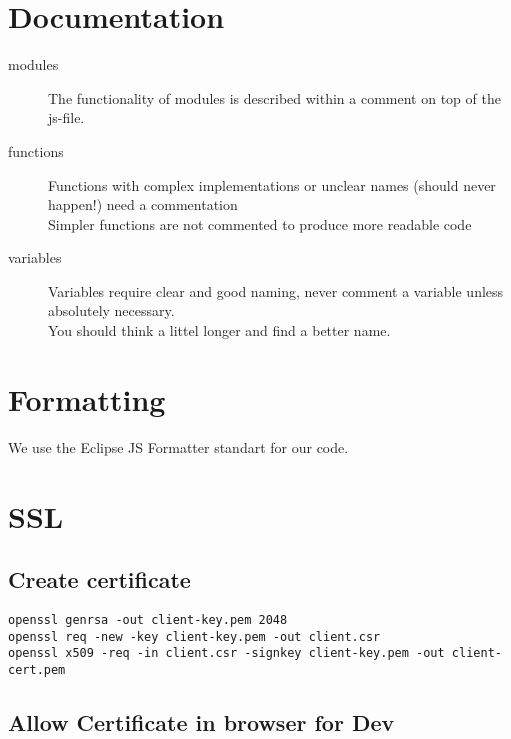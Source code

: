 \documentclass[10pt,a4paper,landscape]{article}
\begin{document}
\section{Documentation}
\begin{description}
        \item[modules]
            The functionality of modules is described within a comment on top of the js-file.\\
        \item[functions]
            Functions with complex implementations or unclear names (should never happen!) need a commentation\\
            Simpler functions are not commented to produce more readable code\\
        \item[variables]
            Variables require clear and good naming, never comment a variable unless absolutely necessary.\\ 
            You should think a littel longer and find a better name.\\
\end{description}
\section{Formatting}
We use the Eclipse JS Formatter standart for our code.\\
\section{SSL}
\subsection{Create certificate}
\begin{lstlisting}
openssl genrsa -out client-key.pem 2048
openssl req -new -key client-key.pem -out client.csr
openssl x509 -req -in client.csr -signkey client-key.pem -out client-cert.pem
\end{lstlisting}
\subsection{Allow Certificate in browser for Dev}
\end{document}
